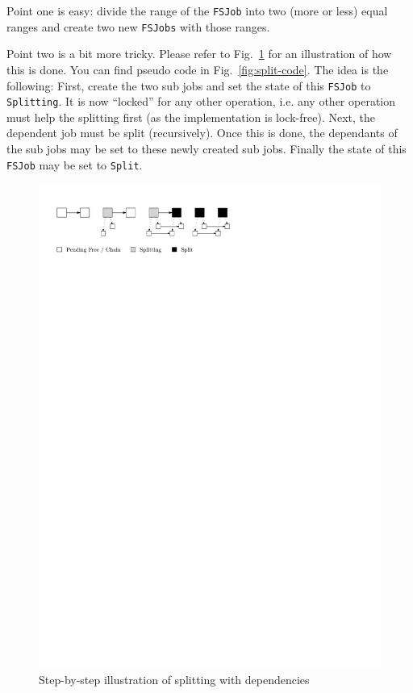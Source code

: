 \documentclass[runningheads,a4paper,fleqn]{llncs}
\begin{document}
Point one is easy: divide the range of the \texttt{FSJob} into two
(more or less) equal ranges and create two new \texttt{FSJobs} with
those ranges.

Point two is a bit more tricky. Please refer to
Fig.~\ref{fig:split-ill}
for an illustration of how this is done. You can find pseudo code in
Fig.~\ref{fig:split-code}. The idea is the following: First, create the
two sub jobs and set the state of this \texttt{FSJob} to
\texttt{Splitting}. It is now ``locked'' for any other operation,
i.e. any
other operation must help the splitting first (as the implementation
is lock-free). Next, the dependent job must be split
(recursively). Once this is done, the dependants of the sub jobs may be
set to these newly created sub jobs. Finally the state of this
\texttt{FSJob} may be set to \texttt{Split}.

\begin{figure}
  \centering
  \includegraphics[trim = 0mm 18mm 0mm 0mm, clip]{split}
  \caption{Step-by-step illustration of splitting with dependencies}
  \label{fig:split-ill}
\end{figure}
\end{document}
